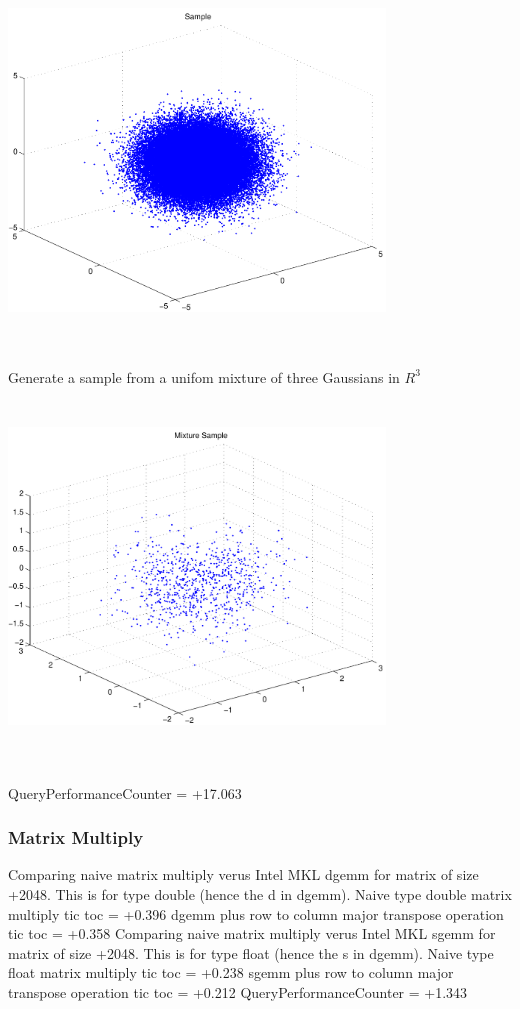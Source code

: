 \documentclass[9pt]{article}
\theoremstyle{plain}
\theoremstyle{definition}
\theoremstyle{remark}
\numberwithin{equation}{section}
\begin{document}
\includegraphics[width=10.0cm,height=10.0cm]{R_3_Normal.pdf}

Generate a sample from a unifom mixture of three Gaussians in $R^3$
\includegraphics[width=10.0cm,height=10.0cm]{R_3_Normal_Mixture.pdf}

QueryPerformanceCounter  =  +17.063
\subsubsection{Matrix Multiply}
Comparing naive matrix multiply verus Intel MKL dgemm for matrix of size +2048.
This is for type double (hence the d in dgemm).
Naive type double matrix multiply tic toc  =  +0.396
dgemm plus row to column major transpose operation tic toc  =  +0.358
Comparing naive matrix multiply verus Intel MKL sgemm for matrix of size +2048.
This is for type float (hence the s in dgemm).
Naive type float matrix multiply tic toc  =  +0.238
sgemm plus row to column major transpose operation tic toc  =  +0.212
QueryPerformanceCounter  =  +1.343
\end{document}
